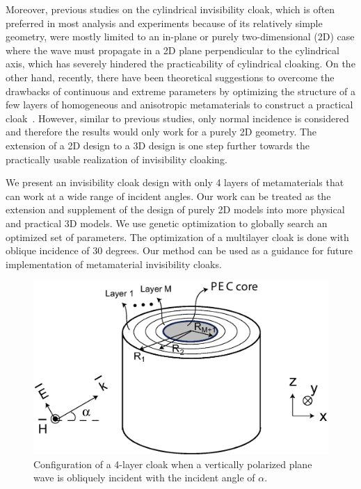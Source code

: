 \documentclass[12pt]{article} %
\begin{document}
Moreover, previous studies on the cylindrical invisibility cloak,
which is often preferred in most analysis and experiments because of
its relatively simple geometry, were mostly limited to an in-plane
or purely two-dimensional (2D) case where the wave must propagate in
a 2D plane perpendicular to the cylindrical axis, which has severely
hindered the practicability of cylindrical cloaking. On the other
hand, recently, there have been theoretical suggestions to overcome
the drawbacks of continuous and extreme parameters by optimizing the
structure of a few layers of homogeneous and anisotropic
metamaterials to construct a practical
cloak~\cite{xi_optimization,popa_optimization}. However, similar to
previous studies, only normal incidence is considered and therefore
the results would only work for a purely 2D geometry. The extension
of a 2D design to a 3D design is one step further towards the
practically usable realization of invisibility cloaking.

We present an invisibility cloak design with only 4 layers of
metamaterials that can work at a wide range of incident angles. Our
work can be treated as the extension and supplement of the design of
purely 2D models into more physical and practical 3D models. We use
genetic optimization to globally search an optimized set of
parameters. The optimization of a multilayer cloak is done with
oblique incidence of 30 degrees. Our method can be used as a
guidance for future implementation of metamaterial invisibility
cloaks.


\begin{figure}
\centering
\includegraphics[width=0.5\columnwidth,draft=false]{Fig_1}%
\caption{\label{fig:geneticoblique} Configuration of a 4-layer cloak
when a vertically polarized plane wave is obliquely incident with
the incident angle of $\alpha$.}
\end{figure}
\end{document}
